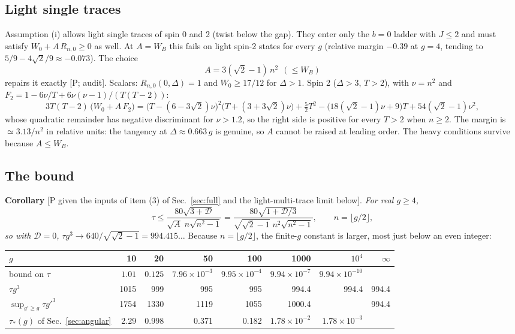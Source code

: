\subsection{Light single traces}
\label{sec:allk-light1}
Assumption (i) allows light single traces of spin 0 and 2 (twist below the gap). They enter only the $b=0$ ladder with $J\le2$ and must
satisfy $W_0+A\,R_{n,0}\ge0$ as well. At $A=W_B$ this fails on light spin-2 states for every $g$ (relative margin $-0.39$ at $g=4$, tending
to $5/9-4\sqrt2/9\approx-0.073$). The choice
\begin{equation}
A=3(\sqrt2-1)\,n^2\ \ (\le W_B)
\label{eq:allk-A}
\end{equation}
repairs it exactly [P; audit]. Scalars: $R_{n,0}(0,\Delta)=1$ and $W_0\ge17/12$ for $\Delta>1$. Spin 2 ($\Delta>3$, $T>2$), with $\nu=n^2$ and
$F_2=1-6\nu/T+6\nu(\nu-1)/(T(T-2))$:
\begin{equation}
3T(T-2)\,\big(W_0+A\,F_2\big)=\big(T-(6-3\sqrt2)\nu\big)^2\big(T+(3+3\sqrt2)\nu\big)+\tfrac52T^2-\big(18(\sqrt2-1)\nu+9\big)T+54(\sqrt2-1)\nu^2,
\label{eq:allk-light}
\end{equation}
whose quadratic remainder has negative discriminant for $\nu>1.2$, so the right side is positive for every $T>2$ when $n\ge2$. The margin is
$\simeq3.13/n^2$ in relative units: the tangency at $\Delta\approx0.663\,g$ is genuine, so $A$ cannot be raised at leading order. The heavy
conditions survive because $A\le W_B$.

\subsection{The bound}
\label{sec:allk-bound}
\textbf{Corollary} [P given the inputs of item (3) of Sec.~\ref{sec:full} and the light-multi-trace limit below]. \emph{For real $g\ge4$,}
\begin{equation}
\tau\le\frac{80\sqrt{3+\mathcal D}}{\sqrt A\;n\sqrt{n^2-1}}
=\frac{80\sqrt{1+\mathcal D/3}}{\sqrt{\sqrt2-1}\;n^2\sqrt{n^2-1}},\qquad n=\lfloor g/2\rfloor,
\label{eq:allk-bound}
\end{equation}
\emph{so with $\mathcal D=0$, $\tau g^3\to640/\sqrt{\sqrt2-1}=994.415\ldots$} Because $n=\lfloor g/2\rfloor$, the finite-$g$ constant is larger, most
just below an even integer:

\begin{center}\footnotesize
\begin{tabular}{@{}lrrrrrrr@{}}
\toprule
$g$ & 10 & 20 & 50 & 100 & 1000 & $10^4$ & $\infty$\\\midrule
bound on $\tau$ & $1.01$ & $0.125$ & $7.96\times10^{-3}$ & $9.95\times10^{-4}$ & $9.94\times10^{-7}$ & $9.94\times10^{-10}$ & \\
$\tau g^3$ & 1015 & 999 & 995 & 995 & 994.4 & 994.4 & 994.4\\
$\sup_{g'\ge g}\tau g'^3$ & 1754 & 1330 & 1119 & 1055 & 1000.4 & & 994.4\\
$\tau_*(g)$ of Sec.~\ref{sec:angular} & 2.29 & 0.998 & 0.371 & 0.182 & $1.78\times10^{-2}$ & $1.78\times10^{-3}$ & \\
\bottomrule
\end{tabular}
\end{center}

